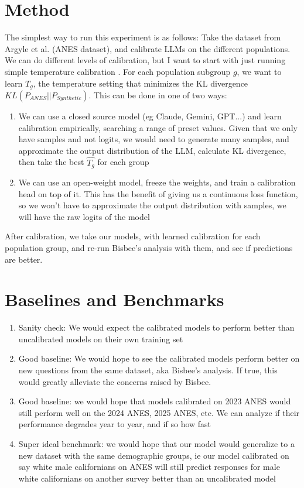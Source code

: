 \documentclass{scrartcl}
\begin{document}
\section{Method}
The simplest way to run this experiment is as follows:
Take the dataset from Argyle et al. \cite{Argyle} (ANES dataset), and calibrate LLMs on the different populations. We can do different levels of calibration, but I want to start with just running simple temperature calibration \cite{guo}. For each population subgroup $g$, we want to learn $T_g$, the temperature setting that minimizes the KL divergence $KL(P_{ANES} || P_{Synthetic})$.
This can be done in one of two ways:
\begin{enumerate}
    \item We can use a closed source model (eg Claude, Gemini, GPT...) and learn calibration empirically, searching a range of preset values. Given that we only have samples and not logits, we would need to generate many samples, and approximate the output distribution of the LLM, calculate KL divergence, then take the best $\hat{T_g}$ for each group
    \item We can use an open-weight model, freeze the weights, and train a calibration head on top of it. This has the benefit of giving us a continuous loss function, so we won't have to approximate the output distribution with samples, we will have the raw logits of the model
\end{enumerate}
After calibration, we take our models, with learned calibration for each population group, and re-run Bisbee’s analysis with them, and see if predictions are better.

\section{Baselines and Benchmarks}
\begin{enumerate}
    \item Sanity check: We would expect the calibrated models to perform better than uncalibrated models on their own training set
    \item Good baseline: We would hope to see the calibrated models perform better on new questions from the same dataset, aka Bisbee’s analysis. If true, this would greatly alleviate the concerns raised by Bisbee.
    \item Good baseline: we would hope that models calibrated on 2023 ANES would still perform well on the 2024 ANES, 2025 ANES, etc. We can analyze if their performance degrades year to year, and if so how fast
    \item Super ideal benchmark: we would hope that our model would generalize to a new dataset with the same demographic groups, ie our model calibrated on say white male californians on ANES will still predict responses for male white californians on another survey better than an uncalibrated model
\end{enumerate}
\end{document}
